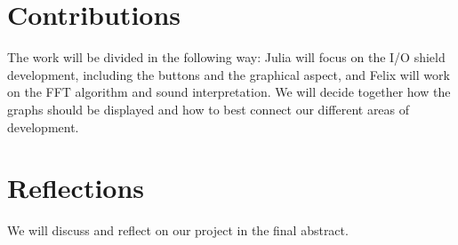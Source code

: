 \documentclass[a4paper,11pt]{article}
\begin{document}
\section*{Contributions}
The work will be divided in the following way: Julia will focus on the I/O shield development, including the buttons and the graphical aspect, and Felix will work on the FFT algorithm and sound interpretation. We will decide together how the graphs should be displayed and how to best connect our different areas of development.




\section*{Reflections}
We will discuss and reflect on our project in the final abstract.
\end{document}
